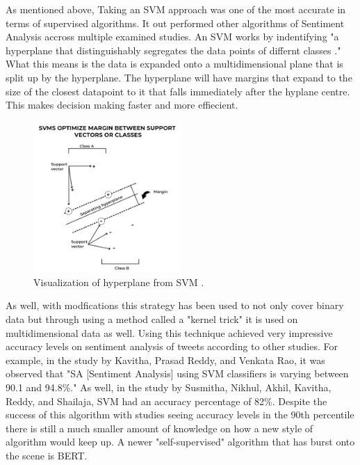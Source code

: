 \documentclass[conference]{IEEEtran}
\begin{document}
As mentioned above, Taking an SVM approach was one of the most accurate in terms of supervised algorithms.
It out performed other algorithms of Sentiment Analysis accross multiple examined studies. 
An SVM works by indentifying "a hyperplane that distinguishably segregates the data points of differnt classes \cite{b6}." 
What this means is the data is expanded onto a multidimensional plane that is split up by the hyperplane. 
The hyperplane will have margins that expand to the size of the closest datapoint to it that falls immediately after the hyplane centre. 
This makes decision making faster and more effiecient. 
\begin{figure}[t]
    \centerline{\includegraphics[width=0.5\textwidth]{SVMVisualization.png}}
    \caption{Visualization of hyperplane from SVM \cite{b6}.}
\end{figure}
As well, with modfications this strategy has been used to not only cover binary data but through using a method called a "kernel trick\cite{b6}" it is used on multidimensional data as well. 
Using this technique achieved very impressive accuracy levels on sentiment analysis of tweets according to other studies.
For example, in the study by Kavitha, Prasad Reddy, and Venkata Rao, it was observed that "SA [Sentiment Analysis] using SVM classifiers is varying between 90.1 and 94.8\%\cite{11}."
As well, in the study by Susmitha, Nikhul, Akhil, Kavitha, Reddy, and Shailaja, SVM had an accuracy percentage of 82\%\cite{b5}. 
Despite the success of this algorithm with studies seeing accuracy levels in the 90th percentile there is still a much smaller amount of knowledge on how a new style of algorithm would keep up.
A newer "self-supervised\cite{b7}" algorithm that has burst onto the scene is BERT.\newline 
\end{document}
